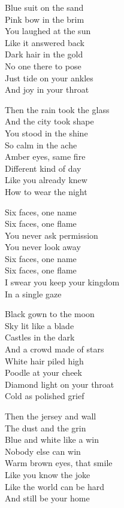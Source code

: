 \begin{lyrics}
Blue suit on the sand\\
Pink bow in the brim\\
You laughed at the sun\\
Like it answered back\\
Dark hair in the gold\\
No one there to pose\\
Just tide on your ankles\\
And joy in your throat

Then the rain took the glass\\
And the city took shape\\
You stood in the shine\\
So calm in the ache\\
Amber eyes, same fire\\
Different kind of day\\
Like you already knew\\
How to wear the night

Six faces, one name\\
Six faces, one flame\\
You never ask permission\\
You never look away\\
Six faces, one name\\
Six faces, one flame\\
I swear you keep your kingdom\\
In a single gaze

Black gown to the moon\\
Sky lit like a blade\\
Castles in the dark\\
And a crowd made of stars\\
White hair piled high\\
Poodle at your cheek\\
Diamond light on your throat\\
Cold as polished grief

Then the jersey and wall\\
The dust and the grin\\
Blue and white like a win\\
Nobody else can win\\
Warm brown eyes, that smile\\
Like you know the joke\\
Like the world can be hard\\
And still be your home


\end{lyrics}
